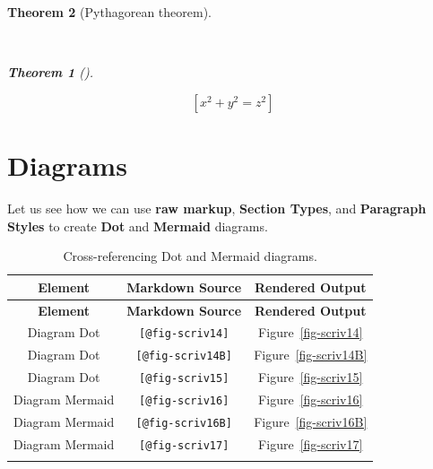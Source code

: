 \documentclass[
  12pt,
  a4paper,
  oneside,
  numbers=noenddot,
  titlepage,
  toclink=all,
  toc=bibliography]{scrbook}
\theoremstyle{definition}
\theoremstyle{definition}
\theoremstyle{definition}
\theoremstyle{plain}
\theoremstyle{plain}
\theoremstyle{plain}
\theoremstyle{plain}
\newtheorem{theorem}{Theorem}[section]
\theoremstyle{plain}
\theoremstyle{remark}
\begin{document}
\begin{theorem}[Pythagorean
theorem]\protect\hypertarget{thm-scriv12}{}\label{thm-scriv12}

~

\begin{theorem}[]\protect\hypertarget{thm-scriv12}{}\label{thm-scriv12}

\[[ x^2 + y^2 = z^2 ]\]

\end{theorem}

\end{theorem}

\newpage{}

\hypertarget{sec-scriv13}{%
\section{Diagrams}\label{sec-scriv13}}

Let us see how we can use \textbf{raw markup}, \textbf{Section Types},
and \textbf{Paragraph Styles} to create \textbf{Dot} and
\textbf{Mermaid} diagrams.

\hypertarget{tbl-scriv13}{}
\begin{longtable}[]{@{}ccc@{}}
\toprule\noalign{}
\textbf{Element} & \textbf{Markdown Source} & \textbf{Rendered
Output} \\
\midrule\noalign{}
\endfirsthead
\toprule\noalign{}
\textbf{Element} & \textbf{Markdown Source} & \textbf{Rendered
Output} \\
\midrule\noalign{}
\endhead
\bottomrule\noalign{}
\endlastfoot
Diagram Dot & \texttt{{[}@fig-scriv14{]}} &
\protect\hypertarget{cite_67}{}{\label{cite_67}Figure~\ref{fig-scriv14}} \\
Diagram Dot & \texttt{{[}@fig-scriv14B{]}} &
\protect\hypertarget{cite_68}{}{\label{cite_68}Figure~\ref{fig-scriv14B}} \\
Diagram Dot & \texttt{{[}@fig-scriv15{]}} &
\protect\hypertarget{cite_69}{}{\label{cite_69}Figure~\ref{fig-scriv15}} \\
Diagram Mermaid & \texttt{{[}@fig-scriv16{]}} &
\protect\hypertarget{cite_70}{}{\label{cite_70}Figure~\ref{fig-scriv16}} \\
Diagram Mermaid & \texttt{{[}@fig-scriv16B{]}} &
\protect\hypertarget{cite_71}{}{\label{cite_71}Figure~\ref{fig-scriv16B}} \\
Diagram Mermaid & \texttt{{[}@fig-scriv17{]}} &
\protect\hypertarget{cite_72}{}{\label{cite_72}Figure~\ref{fig-scriv17}} \\
\caption{\label{tbl-scriv13}Cross-referencing Dot and Mermaid
diagrams.}\tabularnewline
\end{longtable}
\end{document}
